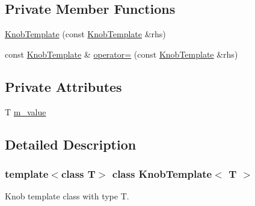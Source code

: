 \subsection*{Private Member Functions}
\begin{DoxyCompactItemize}
\item 
\hyperlink{classKnobTemplate_a9f2d6a9dec66f03aba4af96a23b038a0}{KnobTemplate} (const \hyperlink{classKnobTemplate}{KnobTemplate} \&rhs)
\item 
const \hyperlink{classKnobTemplate}{KnobTemplate} \& \hyperlink{classKnobTemplate_a8e6df8ed32887499f1d2bac4d46c079d}{operator=} (const \hyperlink{classKnobTemplate}{KnobTemplate} \&rhs)
\end{DoxyCompactItemize}
\subsection*{Private Attributes}
\begin{DoxyCompactItemize}
\item 
T \hyperlink{classKnobTemplate_a39c36d8924757ad7ef98e51eecadc033}{m\_\-value}
\end{DoxyCompactItemize}


\subsection{Detailed Description}
\subsubsection*{template$<$class T$>$ class KnobTemplate$<$ T $>$}

Knob template class with type T. 

